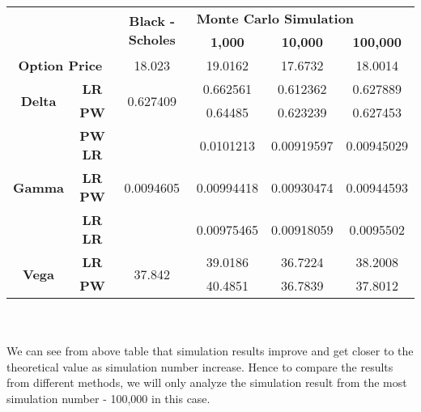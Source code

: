 \documentclass[12pt,a4paper,fleqn]{article}
\begin{document}
\label{my-label}
\begin{tabular}{|c|c|c|c|c|c|}
\hline
\multicolumn{2}{|c|}{\multirow{2}{*}{}}          & \multirow{2}{*}{\textbf{Black -Scholes}} & \multicolumn{3}{l|}{\textbf{Monte Carlo Simulation}} \\ \cline{4-6}
\multicolumn{2}{|c|}{}                           &                                          & \textbf{1,000}  & \textbf{10,000} & \textbf{100,000} \\ \hline
\multicolumn{2}{|c|}{\textbf{Option Price}}      & 18.023                                   & 19.0162         & 17.6732         & 18.0014          \\ \hline
\multirow{2}{*}{\textbf{Delta}} & \textbf{LR}    & \multirow{2}{*}{0.627409}                & 0.662561        & 0.612362        & 0.627889         \\ \cline{2-2} \cline{4-6}
                                & \textbf{PW}    &                                          & 0.64485         & 0.623239        & 0.627453         \\ \hline
\multirow{3}{*}{\textbf{Gamma}} & \textbf{PW LR} & \multirow{3}{*}{0.0094605}               & 0.0101213       & 0.00919597      & 0.00945029       \\ \cline{2-2} \cline{4-6}
                                & \textbf{LR PW} &                                          & 0.00994418      & 0.00930474      & 0.00944593       \\ \cline{2-2} \cline{4-6}
                                & \textbf{LR LR} &                                          & 0.00975465      & 0.00918059      & 0.0095502        \\ \hline
\multirow{2}{*}{\textbf{Vega}}  & \textbf{LR}    & \multirow{2}{*}{37.842}                  & 39.0186         & 36.7224         & 38.2008          \\ \cline{2-2} \cline{4-6}
                                & \textbf{PW}    &                                          & 40.4851         & 36.7839         & 37.8012          \\ \hline
\end{tabular}\\ \\


We can see from above table that simulation results improve and get closer to the theoretical value as simulation number increase. Hence to compare the results from different methods, we will only analyze the simulation result from the most simulation number - 100,000 in this case.
\end{document}

